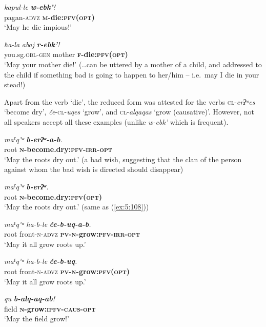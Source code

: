 ﻿\documentclass[output=paper]{langsci/langscibook}
\begin{document}
\ex %
\gll \emph{kapul-le} \emph{\textbf{w-ebk'}!}\\
 pagan-\textsc{advz} \textbf{\textsc{m}-die:\textsc{pfv}(\textsc{opt})}\\
\glt `May he die impious!'

\ex %
\gll \emph{ħa-la} \emph{abaj} \emph{\textbf{r-ebk'}!}\\
 you.sg.\textsc{obl}-\textsc{gen} mother \textbf{\textsc{f}-die:\textsc{pfv}(\textsc{opt})}\\
\glt `May your mother die!' (\ldots{}can be uttered by a mother of a child,
and addressed to the child if something bad is going to happen to
her/him – i.e.\ may I die in your stead!)
\z

Apart from the verb `die', the reduced form was attested for the
verbs \textsc{cl}-\emph{erʔʷes} `become dry',
\emph{če}-\textsc{cl}-\emph{uqes} `grow', and \textsc{cl}-\emph{alqaqas} `grow (causative)'. However, not all speakers accept all these examples
(unlike \emph{w-ebk'} which is frequent).

\ea \label{ex:5:108} %
\gll \emph{maˤq'ʷ} \emph{\textbf{b-erʔʷ-a-b}.}\\
 root \textbf{\textsc{n}-become.dry:\textsc{pfv}-\textsc{irr}-\textsc{opt}}\\
\glt `May the roots dry out.' (a bad wish, suggesting that the 
clan of the person against whom the bad wish is directed should disappear)

\ex %
\gll \emph{maˤq'ʷ} \emph{\textbf{b-erʔʷ}.}\\
 root \textbf{\textsc{n}-become.dry:\textsc{pfv}(\textsc{opt})}\\
\glt `May the roots dry out.' (same as (\ref{ex:5:108}))

\ex %
\gll \emph{maˤq'ʷ} \emph{ha-b-le}  \emph{\textbf{če-b-uq-a-b}.}\\
 root front-\textsc{n}-\textsc{advz} \textbf{\textsc{pv}-\textsc{n}-grow:\textsc{pfv}-\textsc{irr}-\textsc{opt}}\\
\glt `May it all grow roots up.'

\ex \label{ex:5:111} %
\gll \emph{maˤq'ʷ} \emph{ha-b-le}  \emph{\textbf{če-b-uq}.}\\
 root front-\textsc{n}-\textsc{advz} \textbf{\textsc{pv}-\textsc{n}-grow:\textsc{pfv}(\textsc{opt})}\\
\glt `May it all grow roots up.'

\ex \label{ex:5:112} %
\gll \emph{qu} \emph{\textbf{b-alq-aq-ab}!}\\
 field \textbf{\textsc{n}-grow:\textsc{ipfv}-\textsc{caus}-\textsc{opt}}\\
\glt `May the field grow!'
\end{document}
